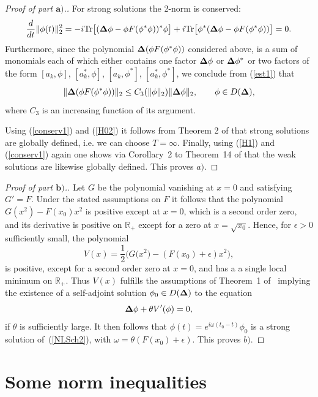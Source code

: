 \documentclass[10pt,a4paper]{amsart}
\begin{document}
\begin{proof}[Proof of part $\boldsymbol{a)}$.]
For strong solutions the 2-norm is conserved:
\begin{gather}\label{conserv1}
\frac{d}{dt}\Vert\phi(t)\Vert^2_2
= -i{\rm Tr}\big[({\bf\Delta}\phi -\phi F(\phi^*\phi))^*\phi\big] +
i{\rm Tr}\big[\phi^*({\bf\Delta}\phi-\phi F(\phi^*\phi))\big] =0 .
\end{gather}
Furthermore, since the polynomial ${\bf\Delta}(\phi F(\phi^*\phi))$ considered
above,  is a sum of monomials each of which either contains one factor
${\bf\Delta}\phi$ or ${\bf\Delta}\phi^*$ or two factors of the form
$[a_k,\phi]$, $[a^*_k,\phi]$, $[a_k,\phi^*]$,  $[a^*_k,\phi^*]$, we
conclude from (\ref{est1}) that
\begin{gather}\label{H02}
\Vert{\bf\Delta}( \phi F(\phi^*\phi))\Vert _2\leq C_3(\Vert\phi\Vert_2)
\Vert{\bf\Delta}\phi\Vert_2 ,\qquad \phi\in D({\bf\Delta}) ,
\end{gather}
where $C_3$ is an increasing function of its argument.

Using (\ref{conserv1}) and (\ref{H02}) it follows from Theorem 2 of
\cite{Reed} that strong solutions are globally def\/ined, i.e. we can
choose $T=\infty$. Finally, using (\ref{H1}) and (\ref{conserv1}) again
one shows via Corollary~2 to Theorem~14 of \cite{Reed} that the weak
solutions are likewise globally def\/ined. This proves $a)$.
\end{proof}

\begin{proof}[Proof of part $\boldsymbol{b)}$.] Let $G$ be the polynomial vanishing
at $x=0$ and satisfying $G'=F$. Under the stated assumptions on $F$
it follows that the polynomial $G(x^2)-F(x_0)x^2$ is positive  except
at $x=0$, which is a second order zero, and its derivative is positive
on $\mathbb R_+$ except for a zero at $x=\sqrt{x_0}$. Hence, for
$\epsilon >0$ suf\/f\/iciently small, the polynomial
\[
V(x) = \frac 12\big(G\big(x^2\big)- (F(x_0)+\epsilon)x^2\big) ,
\]
is positive, except for a second order zero at $x=0$, and has a
a single local minimum on $\mathbb R_+$. Thus $V(x)$ fulf\/ills the
assumptions of Theorem~1 of~\cite{DJN} implying the existence of a
self-adjoint solution $\phi_0\in D({\bf\Delta})$ to the equation
\[
{\bf\Delta}\phi + \theta V'(\phi) = 0 ,
\]
if $\theta$ is suf\/f\/iciently large.  It then follows that $\phi(t) =
e^{i\omega(t_0-t)}\phi_0$ is a strong solution of~(\ref{NLSch2}), with
$\omega=\theta(F(x_0)+\epsilon)$.
This proves $b)$.
\end{proof}


\section{Some norm inequalities}
\label{secframe}
\end{document}
